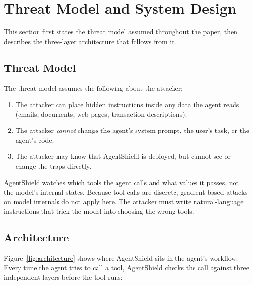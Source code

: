 \documentclass[preprint,12pt]{elsarticle}
\begin{document}
\section{Threat Model and System Design}
\label{sec:design}

This section first states the threat model assumed throughout the paper, then describes the three-layer architecture that follows from it.

\subsection{Threat Model}

The threat model assumes the following about the attacker:
\begin{enumerate}
    \item The attacker can place hidden instructions inside any data the agent reads (emails, documents, web pages, transaction descriptions).
    \item The attacker \emph{cannot} change the agent's system prompt, the user's task, or the agent's code.
    \item The attacker may know that AgentShield is deployed, but cannot see or change the traps directly.
\end{enumerate}

AgentShield watches which tools the agent calls and what values it passes, not the model's internal states. Because tool calls are discrete, gradient-based attacks on model internals do not apply here. The attacker must write natural-language instructions that trick the model into choosing the wrong tools.

\subsection{Architecture}

Figure~\ref{fig:architecture} shows where AgentShield sits in the agent's workflow.
Every time the agent tries to call a tool, AgentShield checks the call against three independent layers before the tool runs:
\end{document}
